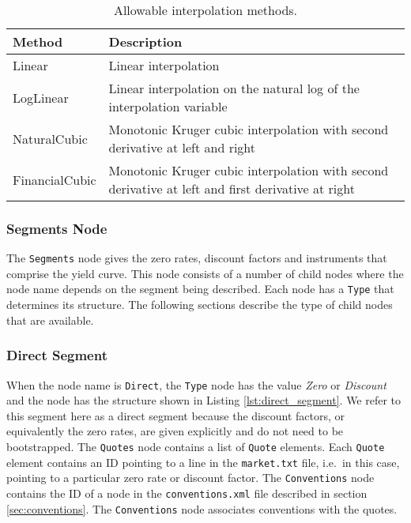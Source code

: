 \begin{table}[h]
\centering
  \begin{tabu} to 0.9\linewidth {| X[-1.5,l,m] | X[-5,l,m] |}
    \hline
    \bfseries{Method} & \bfseries{Description} \\
    \hline
    Linear & Linear interpolation \\ \hline
    LogLinear & Linear interpolation on the natural log of the interpolation variable \\ \hline
    NaturalCubic & Monotonic Kruger cubic interpolation with second derivative at left and right \\ \hline
    FinancialCubic & Monotonic Kruger cubic interpolation with second derivative at left and 
                     first derivative at right \\ \hline
  \end{tabu}
  \caption{Allowable interpolation methods.}
  \label{tab:allow_interp_methods}
\end{table}
\subsubsection*{Segments Node} \label{ss:segments_node}
The \lstinline!Segments! node gives the zero rates, discount factors and instruments that comprise the yield curve. This 
node consists of a number of child nodes where the node name depends on the segment being described. Each node has a 
\lstinline!Type! that determines its structure. The following sections describe the type of child nodes that are 
available.

\subsubsection*{Direct Segment}
When the node name is \lstinline!Direct!, the \lstinline!Type! node has the value \emph{Zero} or \emph{Discount} and the 
node has the structure shown in Listing \ref{lst:direct_segment}. We refer to this segment here as a direct segment 
because the discount factors, or equivalently the zero rates, are given explicitly and do not need to be bootstrapped. The 
\lstinline!Quotes! node contains a list of \lstinline!Quote! elements. Each \lstinline!Quote! element contains an ID 
pointing to a line in the {\tt market.txt} file, i.e.\ in this case, pointing to a particular zero rate or discount 
factor. The \lstinline!Conventions! node contains the ID of a node in the {\tt conventions.xml} file described in section 
\ref{sec:conventions}. The \lstinline!Conventions! node associates conventions with the quotes.

